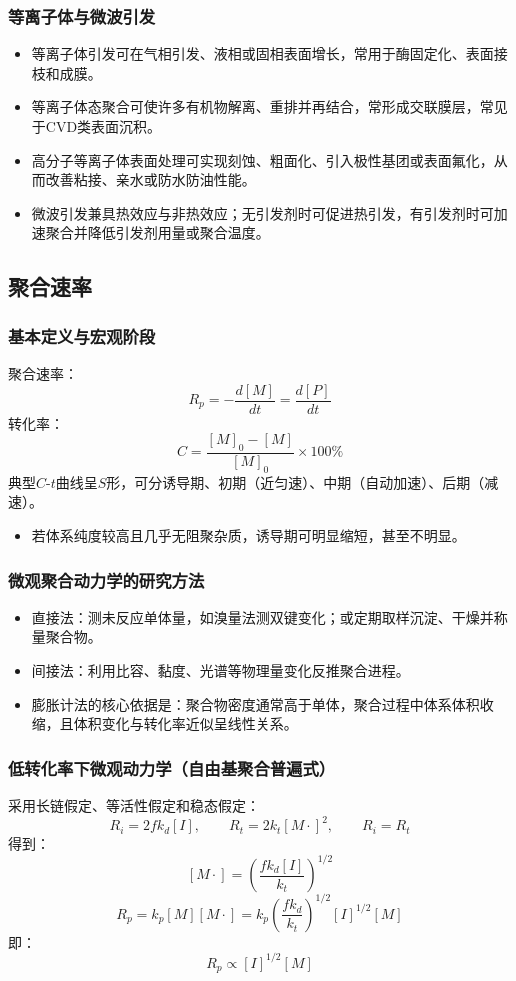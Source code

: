 ﻿\documentclass[12pt,a4paper]{article}
\begin{document}
\subsubsection{等离子体与微波引发}
\begin{itemize}
  \item 等离子体引发可在气相引发、液相或固相表面增长，常用于酶固定化、表面接枝和成膜。
  \item 等离子体态聚合可使许多有机物解离、重排并再结合，常形成交联膜层，常见于CVD类表面沉积。
  \item 高分子等离子体表面处理可实现刻蚀、粗面化、引入极性基团或表面氟化，从而改善粘接、亲水或防水防油性能。
  \item 微波引发兼具热效应与非热效应；无引发剂时可促进热引发，有引发剂时可加速聚合并降低引发剂用量或聚合温度。
\end{itemize}

\subsection{聚合速率}
\subsubsection{基本定义与宏观阶段}
聚合速率：
\[
R_p=-\frac{d[M]}{dt}=\frac{d[P]}{dt}
\]
转化率：
\[
C=\frac{[M]_0-[M]}{[M]_0}\times100\%
\]
典型$C$-$t$曲线呈$S$形，可分诱导期、初期（近匀速）、中期（自动加速）、后期（减速）。
\begin{itemize}
  \item 若体系纯度较高且几乎无阻聚杂质，诱导期可明显缩短，甚至不明显。
\end{itemize}

\subsubsection{微观聚合动力学的研究方法}
\begin{itemize}
  \item 直接法：测未反应单体量，如溴量法测双键变化；或定期取样沉淀、干燥并称量聚合物。
  \item 间接法：利用比容、黏度、光谱等物理量变化反推聚合进程。
  \item 膨胀计法的核心依据是：聚合物密度通常高于单体，聚合过程中体系体积收缩，且体积变化与转化率近似呈线性关系。
\end{itemize}

\subsubsection{低转化率下微观动力学（自由基聚合普遍式）}
采用长链假定、等活性假定和稳态假定：
\[
R_i=2fk_d[I],\qquad R_t=2k_t[M\cdot]^2,\qquad R_i=R_t
\]
得到：
\[
[M\cdot]=\left(\frac{fk_d[I]}{k_t}\right)^{1/2}
\]
\[
R_p=k_p[M][M\cdot]=k_p\left(\frac{fk_d}{k_t}\right)^{1/2}[I]^{1/2}[M]
\]
即：
\[
R_p\propto [I]^{1/2}[M]
\]
\end{document}
